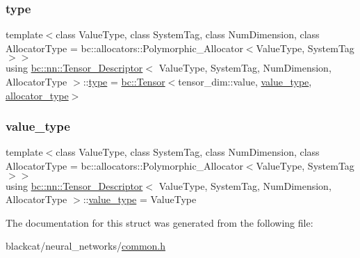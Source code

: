 \subsubsection{\texorpdfstring{type}{type}}
{\footnotesize\ttfamily template$<$class Value\+Type, class System\+Tag, class Num\+Dimension, class Allocator\+Type = bc\+::allocators\+::\+Polymorphic\+\_\+\+Allocator$<$\+Value\+Type, System\+Tag$>$$>$ \\
using \hyperlink{structbc_1_1nn_1_1Tensor__Descriptor}{bc\+::nn\+::\+Tensor\+\_\+\+Descriptor}$<$ Value\+Type, System\+Tag, Num\+Dimension, Allocator\+Type $>$\+::\hyperlink{structbc_1_1nn_1_1Tensor__Descriptor_a9a0efa6c050542ee479a59bb8a252230}{type} =  \hyperlink{namespacebc_a659391e47ab612be3ba6c18cf9c89159}{bc\+::\+Tensor}$<$tensor\+\_\+dim\+::value, \hyperlink{structbc_1_1nn_1_1Tensor__Descriptor_a25a52c900dabe88f90eba926ff8de1cd}{value\+\_\+type}, \hyperlink{structbc_1_1nn_1_1Tensor__Descriptor_ad5bd24271db1a9fb05b06cb64cad55a3}{allocator\+\_\+type}$>$}

\mbox{\label{structbc_1_1nn_1_1Tensor__Descriptor_a25a52c900dabe88f90eba926ff8de1cd}} 
\subsubsection{\texorpdfstring{value\+\_\+type}{value\_type}}
{\footnotesize\ttfamily template$<$class Value\+Type, class System\+Tag, class Num\+Dimension, class Allocator\+Type = bc\+::allocators\+::\+Polymorphic\+\_\+\+Allocator$<$\+Value\+Type, System\+Tag$>$$>$ \\
using \hyperlink{structbc_1_1nn_1_1Tensor__Descriptor}{bc\+::nn\+::\+Tensor\+\_\+\+Descriptor}$<$ Value\+Type, System\+Tag, Num\+Dimension, Allocator\+Type $>$\+::\hyperlink{structbc_1_1nn_1_1Tensor__Descriptor_a25a52c900dabe88f90eba926ff8de1cd}{value\+\_\+type} =  Value\+Type}



The documentation for this struct was generated from the following file\+:\begin{DoxyCompactItemize}
\item 
blackcat/neural\+\_\+networks/\hyperlink{neural__networks_2common_8h}{common.\+h}\end{DoxyCompactItemize}
